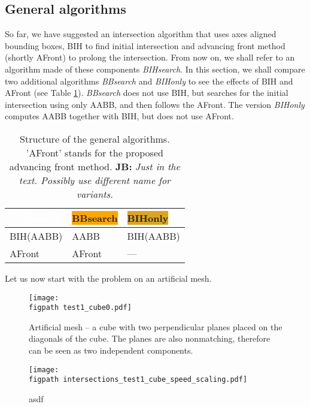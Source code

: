 \documentclass{elsarticle}
\newcommand{\figpath}{figures/}
\newcommand{\noteJB}[1]{{\color{Blue} \textbf{JB: } \textit{#1}}}
\begin{document}
\subsection{General algorithms}
So far, we have suggested an intersection algorithm that uses axes aligned bounding boxes, BIH to find initial
intersection and advancing front method (shortly AFront) to prolong the intersection. From now on, we shall refer to an algorithm made of these components \emph{BIHsearch}. In this section, we shall compare two additional algorithms \emph{BBsearch} and \emph{BIHonly} to see the effects of BIH and AFront (see Table \ref{tab:search_algorithms}). \emph{BBsearch} does not use BIH, but searches for the initial intersection using only AABB, and then follows the AFront. The version 
\emph{BIHonly} computes AABB together with BIH, but does not use AFront.


\begin{table}[!htb]
    \centering
    \renewcommand{\arraystretch}{1.2}
    \begin{tabular}{>{\centering\arraybackslash}p{20ex}
                    >{\centering\arraybackslash}p{20ex}
                    >{\centering\arraybackslash}p{20ex}}
        \colorbox{NavyBlue}{\textcolor{white}{BIHsearch\vphantom{By}}} & \colorbox{orange}{BBsearch\vphantom{By}} & \colorbox{Goldenrod}{BIHonly\vphantom{By}} \\ \hline
        BIH(AABB) & AABB & BIH(AABB) \\
        AFront & AFront & ---
    \end{tabular}
    \caption{Structure of the general algorithms. 'AFront' stands for the proposed advancing front method.
    \noteJB{Just in the text. Possibly use different name for variants.}}
    \label{tab:search_algorithms}
\end{table}

Let us now start with the problem on an artificial mesh. 

\begin{figure}[!htb]
    \centering
    \texttt{[image: \\figpath test1\_cube0.pdf]}
    \caption{Artificial mesh -- a cube with two perpendicular planes placed on the diagonals of the cube.
             The planes are also nonmatching, therefore can be seen as two independent components.}
    \label{fig:cube_mesh}
\end{figure}
  
\begin{figure}[!htb]
    \centering
    \texttt{[image: \\figpath intersections\_test1\_cube\_speed\_scaling.pdf]}
    \caption{asdf}
    \label{fig:cube_speed}
\end{figure}
\end{document}
